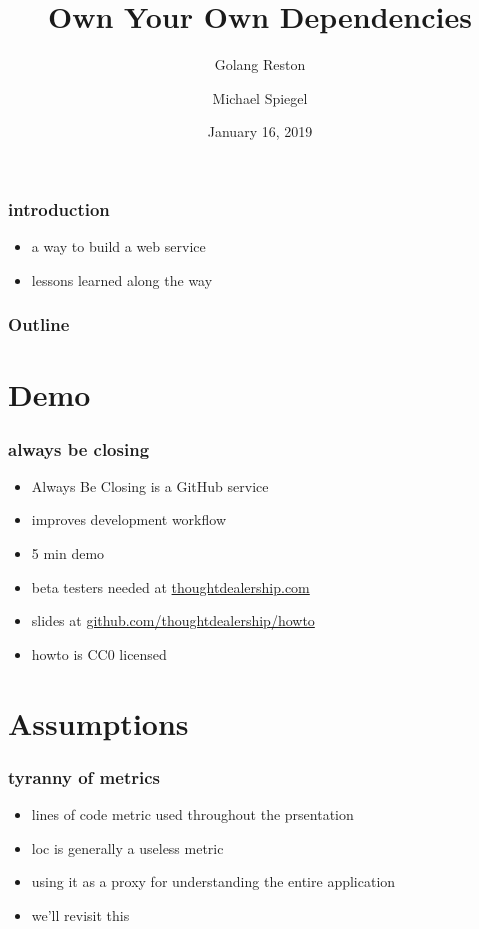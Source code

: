 \documentclass{beamer}
\title{Own Your Own Dependencies}
\subtitle{Golang Reston}
\author{Michael Spiegel}
\date{January 16, 2019}
\begin{document}
\begin{frame}
\titlepage
\end{frame}

\begin{frame}
\frametitle{introduction}
\begin{itemize}
\item a way to build a web service
\item lessons learned along the way
\end{itemize}
\end{frame}

\begin{frame}
\frametitle{Outline}
\tableofcontents
\end{frame}

\section{Demo}
\begin{frame}
\frametitle{always be closing}
\begin{itemize}
\item Always Be Closing is a GitHub service
\item improves development workflow
\item 5 min demo
\pause
\item beta testers needed at \href{https://thoughtdealership.com}{thoughtdealership.com}
\item slides at \href{https://github.com/thoughtdealership/howto}{github.com/thoughtdealership/howto}
\item howto is CC0 licensed
\end{itemize}
\end{frame}

\section{Assumptions}
\begin{frame}
\frametitle{tyranny of metrics}
\begin{itemize}
\item lines of code metric used throughout the prsentation
\item loc is generally a useless metric
\item using it as a proxy for understanding the entire application
\item we'll revisit this
\end{itemize}
\end{frame}
\end{document}
